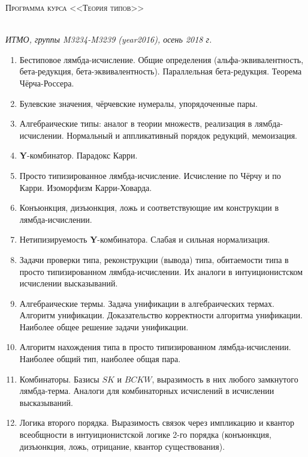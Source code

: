 \documentclass[12pt,a4paper,oneside]{book}
\begin{document}
\pagestyle{empty}

\begin{center}
\begin{Large}\scshape Программа курса <<Теория типов>>\end{Large}\\\vspace{0.1cm}
\textit{ИТМО, группы M3234-M3239 (year2016), осень 2018 г.}
\end{center}
\vspace{0.5cm}

\begin{enumerate}
\item Бестиповое лямбда-исчисление. Общие определения (альфа-эквивалентность, бета-редукция, бета-эквивалентность).
Параллельная бета-редукция. Теорема Чёрча-Россера.
\item Булевские значения, чёрчевские нумералы, упорядоченные пары.
\item Алгебраические типы: аналог в теории множеств, реализация в лямбда-исчислении. 
Нормальный и аппликативный порядок редукций, мемоизация.
\item \textbf{Y}-комбинатор. Парадокс Карри.
\item Просто типизированное лямбда-исчисление. Исчисление по Чёрчу и по Карри. Изоморфизм Карри-Ховарда.
\item Конъюнкция, дизъюнкция, ложь и соответствующие им конструкции в лямбда-исчислении.
\item Нетипизируемость \textbf{Y}-комбинатора. Слабая и сильная нормализация.
\item Задачи проверки типа, реконструкции (вывода) типа, обитаемости типа в просто типизированном лямбда-исчислении.
Их аналоги в интуиционистском исчислении высказываний.
\item Алгебраические термы. Задача унификации в алгебраических термах. Алгоритм унификации. Доказательство 
корректности алгоритма унификации. Наиболее общее решение задачи унификации.
\item Алгоритм нахождения типа в просто типизированном лямбда-исчислении. Наиболее общий тип, наиболее общая пара.
\item Комбинаторы. Базисы $SK$ и $BCKW$, выразимость в них любого замкнутого лямбда-терма.
Аналоги для комбинаторных исчислений в исчислении высказываний.
\item Логика второго порядка. Выразимость связок через импликацию и квантор всеобщности в интуиционистской логике 
2-го порядка (конъюнкция, дизъюнкция, ложь, отрицание, квантор существования).

\end{enumerate}
\end{document}
